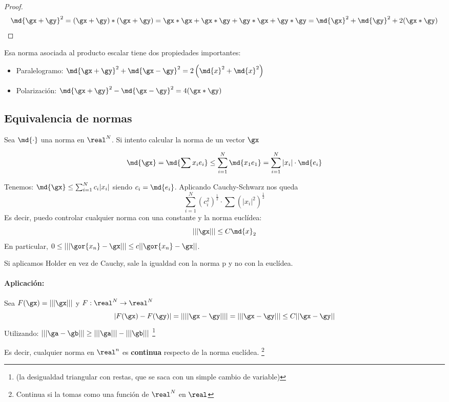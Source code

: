 \documentclass{apuntes}
\begin{document}
\begin{proof}
\[ \md{\gx+\gy}^2 = (\gx+\gy)\ast(\gx+\gy) = \gx \ast \gx + \gx \ast \gy + \gy \ast \gx + \gy \ast \gy=\md{\gx} ^ 2 + \md{\gy} ^ 2+2(\gx\ast\gy) \]
\end{proof}

Esa norma asociada al producto escalar tiene dos propiedades importantes:
\begin{itemize}
\item Paralelogramo: $\md{\gx+\gy}^ 2 + \md{\gx-\gy} ^ 2 = 2\left(\md{x}^2+\md{x}^2\right) $
\item Polarización: $\md{\gx+\gy} ^ 2 - \md{\gx-\gy} ^ 2 = 4(\gx*\gy)$
\end{itemize}


\subsection{Equivalencia de normas}
Sea $\md{\cdot}$ una norma en $\real^N$. Si intento calcular la norma de un vector $\gx$

\[ \md{\gx} = \md{\sum x_i e_i} \leq \sum_{i=1}^N \md{x_1 e_1} = \sum_{i=1}^N|x_i|\cdot\md{e_i} \]

Tenemos: $\md{\gx} \leq \sum_{i=1}^N c_i |x_i|$ siendo $c_i = \md{e_i}$. Aplicando Cauchy-Schwarz  nos queda
\[ \sum_{i=1}^N \left(c_i^2\right)^\frac{1}{2} \cdot \sum \left(|x_i|^2\right)^\frac{1}{2} \]
Es decir, puedo controlar cualquier norma con una constante y la norma euclídea:
$$|||\gx||| \leq C \md{x}_{2}$$
En particular, $0 \leq |||\gor{x_n} - \gx|||\leq c ||\gor{x_n}-\gx||$. 

\begin{remark}
Si aplicamos Holder en vez de Cauchy, sale la igualdad con la norma p y no con la euclídea.
\end{remark}

\paragraph{Aplicación:}
Sea $F(\gx) = |||\gx|||$ y $F:\real^N \rightarrow \real^N$ 
$$|F(\gx)-F(\gy)| = \left| |||\gx - \gy||| \right| = |||\gx - \gy||| \leq C ||\gx - \gy||$$
Utilizando: $|||\ga-\gb||| \ge |||\ga||| - |||\gb|||$ \footnote{(la desigualdad triangular con restas, que se saca con un simple cambio de variable)}

Es decir, cualquier norma en $\real^n$ es \textbf{continua} respecto de la norma euclídea. \footnote{Continua si la tomas como una función de $\real^N$ en $\real$}
\end{document}
